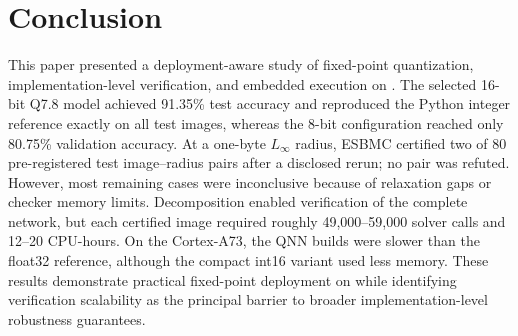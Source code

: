 \section{Conclusion}
\label{sec:conclusion}

This paper presented a deployment-aware study of fixed-point quantization, implementation-level verification, and embedded execution on \AAOS{}. The selected 16-bit Q7.8 model achieved 91.35\% test accuracy and reproduced the Python integer reference exactly on all test images, whereas the 8-bit configuration reached only 80.75\% validation accuracy. At a one-byte $L_\infty$ radius, ESBMC certified two of 80 pre-registered test image--radius pairs after a disclosed rerun; no pair was refuted. However, most remaining cases were inconclusive because of relaxation gaps or checker memory limits. Decomposition enabled verification of the complete network, but each certified image required roughly 49,000--59,000 solver calls and 12--20 CPU-hours. On the Cortex-A73, the QNN builds were slower than the float32 reference, although the compact int16 variant used less memory. These results demonstrate practical fixed-point deployment on \AAOS{} while identifying verification scalability as the principal barrier to broader implementation-level robustness guarantees.